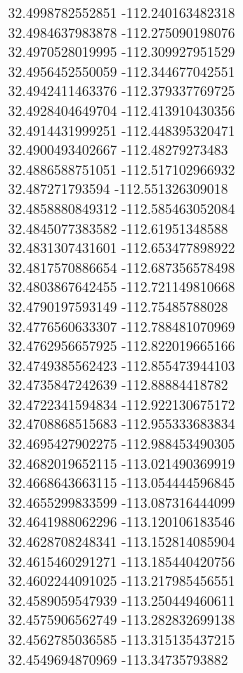 {32.4998782552851	-112.240163482318\\
32.4984637983878	-112.275090198076\\
32.4970528019995	-112.309927951529\\
32.4956452550059	-112.344677042551\\
32.4942411463376	-112.379337769725\\
32.4928404649704	-112.413910430356\\
32.4914431999251	-112.448395320471\\
32.4900493402667	-112.48279273483\\
32.4886588751051	-112.517102966932\\
32.487271793594	-112.551326309018\\
32.4858880849312	-112.585463052084\\
32.4845077383582	-112.61951348588\\
32.4831307431601	-112.653477898922\\
32.4817570886654	-112.687356578498\\
32.4803867642455	-112.721149810668\\
32.4790197593149	-112.75485788028\\
32.4776560633307	-112.788481070969\\
32.4762956657925	-112.822019665166\\
32.4749385562423	-112.855473944103\\
32.4735847242639	-112.88884418782\\
32.4722341594834	-112.922130675172\\
32.4708868515683	-112.955333683834\\
32.4695427902275	-112.988453490305\\
32.4682019652115	-113.021490369919\\
32.4668643663115	-113.054444596845\\
32.4655299833599	-113.087316444099\\
32.4641988062296	-113.120106183546\\
32.4628708248341	-113.152814085904\\
32.4615460291271	-113.185440420756\\
32.4602244091025	-113.217985456551\\
32.4589059547939	-113.250449460611\\
32.4575906562749	-113.282832699138\\
32.4562785036585	-113.315135437215\\
32.4549694870969	-113.34735793882\\
}
